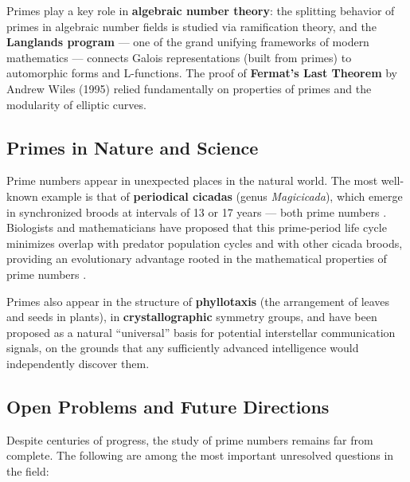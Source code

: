 \documentclass[11pt]{article}
\theoremstyle{plain}
\theoremstyle{definition}
\theoremstyle{remark}
\begin{document}
\par Primes play a key role in \textbf{algebraic number theory}: the splitting behavior of primes in algebraic number fields is studied via ramification theory, and the \textbf{Langlands program} \cite{gelbart_langlands_1984} --- one of the grand unifying frameworks of modern mathematics --- connects Galois representations (built from primes) to automorphic forms and L-functions. The proof of \textbf{Fermat's Last Theorem} by Andrew Wiles (1995) \cite{wiles_flt_1995} relied fundamentally on properties of primes and the modularity of elliptic curves.

\subsection{Primes in Nature and Science}

\par Prime numbers appear in unexpected places in the natural world. The most well-known example is that of \textbf{periodical cicadas} (genus \textit{Magicicada}), which emerge in synchronized broods at intervals of 13 or 17 years --- both prime numbers \cite{yoshimura_cicadas_1997}. Biologists and mathematicians have proposed that this prime-period life cycle minimizes overlap with predator population cycles and with other cicada broods, providing an evolutionary advantage rooted in the mathematical properties of prime numbers \cite{cox_cicadas_1998}.

\par Primes also appear in the structure of \textbf{phyllotaxis} (the arrangement of leaves and seeds in plants), in \textbf{crystallographic} symmetry groups, and have been proposed as a natural ``universal'' basis for potential interstellar communication signals, on the grounds that any sufficiently advanced intelligence would independently discover them.

\subsection{Open Problems and Future Directions}

\par Despite centuries of progress, the study of prime numbers remains far from complete. The following are among the most important unresolved questions in the field:
\end{document}
